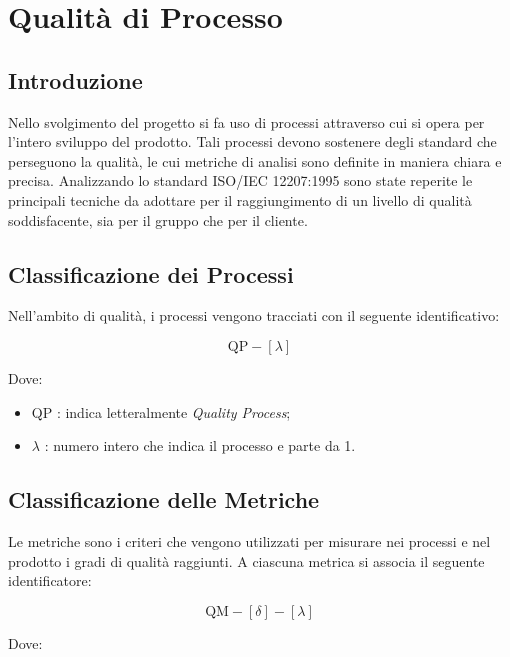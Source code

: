 \section{Qualità di Processo}

\subsection{Introduzione}

Nello svolgimento del progetto si fa uso di processi attraverso cui si opera per l'intero sviluppo del prodotto. Tali processi devono sostenere degli standard che perseguono la qualità, le cui metriche di analisi sono definite in maniera chiara e precisa. Analizzando lo standard ISO/IEC 12207:1995 sono state reperite le principali tecniche da adottare per il raggiungimento di un livello di qualità soddisfacente, sia per il gruppo che per il cliente.



\subsection{Classificazione dei Processi}

Nell'ambito di qualità, i processi vengono tracciati con il seguente identificativo:

\[
		\text{QP}-[\lambda]
\]

Dove: 

\begin{itemize}
	\item QP : indica letteralmente \textit{Quality Process};
	\item \(\lambda\) : numero intero che indica il processo e parte da 1.
\end{itemize}

\subsection{Classificazione delle Metriche}

Le metriche sono i criteri che vengono utilizzati per misurare nei processi e nel prodotto i gradi di qualità raggiunti. A ciascuna metrica si associa il seguente identificatore:

\[
		\text{QM}-[\delta]-[\lambda]
\]

Dove: 

